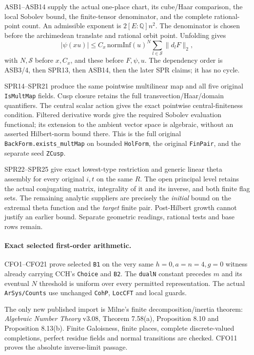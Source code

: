 ASB1--ASB14 supply the actual one-place chart, its cube/Haar
comparison, the local Sobolev bound, the finite-tensor denominator,
and the complete rational-point count. An admissible exponent is
$2[E:\mathbb Q]n^2$. The denominator is chosen before the
archimedean translate and rational orbit point. Unfolding gives
\[
 |\psi(xu)|\le C_x\,\mathrm{normInf}(u)^N
                         \sum_{l\in\mathcal S}\|d_lF\|_2,
\]
with $N,\mathcal S$ before $x,C_x$, and these before $F,\psi,u$.
The dependency order is ASB3/4, then SPR13, then ASB14, then
the later SPR claims; it has no cycle.

SPR14--SPR21 produce the same pointwise multilinear map and all
five original \texttt{IsMultMap} fields. Cusp closure retains the
full transvection/Haar/domain quantifiers. The central scalar action
gives the exact pointwise central-finiteness condition. Filtered
derivative words give the required Sobolev evaluation functional;
its extension to the ambient vector space is algebraic, without
an asserted Hilbert-norm bound there.
This is the full original \texttt{BackForm.exists\_multMap} on
bounded \texttt{HolForm}, the original \texttt{FinPair}, and the
separate seed \texttt{ZCusp}.

SPR22--SPR25 give exact lowest-type restriction and generic linear
theta assembly for every original $i,t$ on the same $R$.
The open principal level retains the actual conjugating matrix,
integrality of it and its inverse, and both finite flag sets.
The remaining analytic suppliers are precisely the \emph{initial}
bound on the extremal theta function and the \emph{target}
finite pair. Post-Hilbert growth cannot justify an earlier bound.
Separate geometric readings, rational tests and base rows remain.

\paragraph{Exact selected first-order arithmetic.}
CFO1--CFO21 prove selected \texttt{B1} on the very same
$h=0,a=n=4,g=0$ witness already carrying CCH's \texttt{Choice}
and \texttt{B2}. The \texttt{dualN} constant precedes $m$ and
its eventual $N$ threshold is uniform over every permitted
representation. The actual \texttt{ArSys/Counts} use unchanged
\texttt{CohP}, \texttt{LocCFT} and local guards.

The only new published import is Milne's finite
decomposition/inertia theorem: \emph{Algebraic Number Theory}
v3.08, Theorem 7.58(a), Proposition 8.10 and Proposition 8.13(b).
Finite Galoisness, finite places, complete discrete-valued
completions, perfect residue fields and normal transitions are
checked. CFO11 proves the absolute inverse-limit passage.


